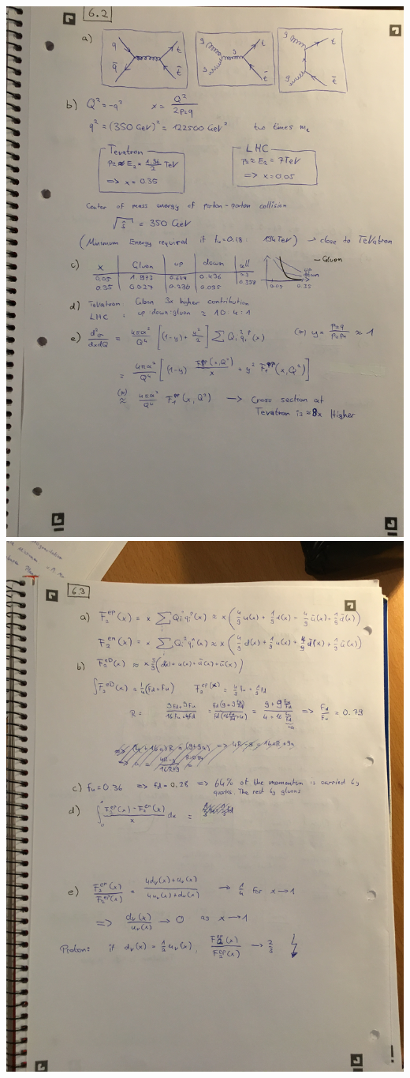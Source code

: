 \documentclass{article}
\begin{document}
    \includegraphics[width=1.4\textwidth,angle=270]{6-2.jpg}
    \includegraphics[width=1.4\textwidth,angle=270]{6-3.jpg}
\end{document}
